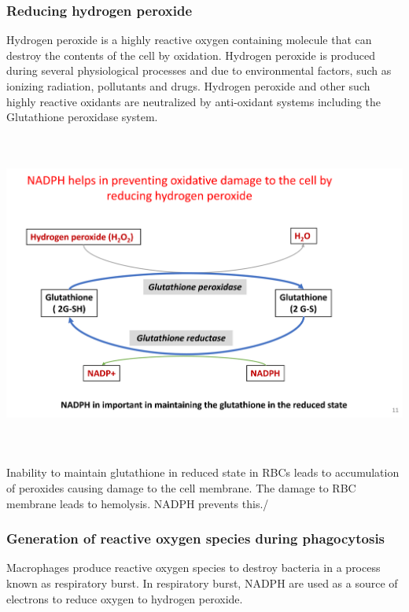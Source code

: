 \documentclass[
]{book}
\begin{document}
\subsubsection{Reducing hydrogen peroxide}\label{reducing-hydrogen-peroxide}

Hydrogen peroxide is a highly reactive oxygen containing molecule that can destroy the contents of the cell by oxidation. Hydrogen peroxide is produced during several physiological processes and due to environmental factors, such as ionizing radiation, pollutants and drugs. Hydrogen peroxide and other such highly reactive oxidants are neutralized by anti-oxidant systems including the Glutathione peroxidase system.

\includegraphics[width=\textwidth,height=4.16667in]{Images/Glutathione.png}

Inability to maintain glutathione in reduced state in RBCs leads to accumulation of peroxides causing damage to the cell membrane. The damage to RBC membrane leads to hemolysis. NADPH prevents this./

\subsubsection{Generation of reactive oxygen species during phagocytosis}\label{generation-of-reactive-oxygen-species-during-phagocytosis}

Macrophages produce reactive oxygen species to destroy bacteria in a process known as respiratory burst. In respiratory burst, NADPH are used as a source of electrons to reduce oxygen to hydrogen peroxide.
\end{document}
